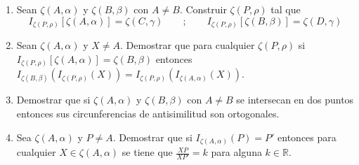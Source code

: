 \documentclass[12pt]{report}
\numberwithin{section}{chapter}
\newcommand{\R}{\mathbb R}
\begin{document}
\begin{enumerate}
\item Sean $\zeta (A,\alpha)$ y $\zeta(B,\beta)$ con $A \neq B$. Construir $\zeta(P, \rho)$ tal que $$I_{\zeta(P, \rho)} [\zeta(A, \alpha)] = \zeta(C, \gamma) \qquad ; \qquad I_{\zeta(P, \rho)} [\zeta(B, \beta)] = \zeta(D, \gamma)$$

\item Sean $\zeta(A,\alpha)$ y $X\neq A$. Demostrar que para cualquier $\zeta(P,\rho)$ si $I_{\zeta(P,\rho)}[\zeta(A,\alpha)] = \zeta(B,\beta)$ entonces $I_{\zeta(B,\beta)}(I_{\zeta(P,\rho)}(X)) = I_{\zeta(P,\rho)}(I_{\zeta(A,\alpha)}(X))$.


\item Demostrar que si $\zeta (A,\alpha)$ y $\zeta(B,\beta)$ con $A \neq B$ se intersecan en dos puntos entonces sus circunferencias de antisimilitud son ortogonales.


\item Sea $\zeta(A, \alpha)$ y $P\neq A$. Demostrar que si $I_{\zeta(A, \alpha)}(P)=P'$ entonces para cualquier $X \in \zeta(A, \alpha)$ se tiene que $\frac{XP}{XP'} = k$ para alguna $k \in \R$.

\end{enumerate}
\end{document}
